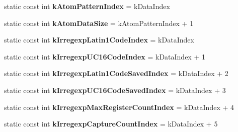 \begin{DoxyCompactItemize}
\item 
static const int {\bfseries k\+Atom\+Pattern\+Index} = k\+Data\+Index\hypertarget{classv8_1_1internal_1_1_j_s_reg_exp_a67adfd18de6fea50f6e492dfdc4b1b04}{}\label{classv8_1_1internal_1_1_j_s_reg_exp_a67adfd18de6fea50f6e492dfdc4b1b04}

\item 
static const int {\bfseries k\+Atom\+Data\+Size} = k\+Atom\+Pattern\+Index + 1\hypertarget{classv8_1_1internal_1_1_j_s_reg_exp_ad68a24d05c9c76742bf98370f73ddde8}{}\label{classv8_1_1internal_1_1_j_s_reg_exp_ad68a24d05c9c76742bf98370f73ddde8}

\item 
static const int {\bfseries k\+Irregexp\+Latin1\+Code\+Index} = k\+Data\+Index\hypertarget{classv8_1_1internal_1_1_j_s_reg_exp_a7d8bb3b9e17479eb8048f9e5d4fc928c}{}\label{classv8_1_1internal_1_1_j_s_reg_exp_a7d8bb3b9e17479eb8048f9e5d4fc928c}

\item 
static const int {\bfseries k\+Irregexp\+U\+C16\+Code\+Index} = k\+Data\+Index + 1\hypertarget{classv8_1_1internal_1_1_j_s_reg_exp_a624664cd30b9dae03165e951d9421831}{}\label{classv8_1_1internal_1_1_j_s_reg_exp_a624664cd30b9dae03165e951d9421831}

\item 
static const int {\bfseries k\+Irregexp\+Latin1\+Code\+Saved\+Index} = k\+Data\+Index + 2\hypertarget{classv8_1_1internal_1_1_j_s_reg_exp_af29f4f258d6cf18df503d7a1203630fb}{}\label{classv8_1_1internal_1_1_j_s_reg_exp_af29f4f258d6cf18df503d7a1203630fb}

\item 
static const int {\bfseries k\+Irregexp\+U\+C16\+Code\+Saved\+Index} = k\+Data\+Index + 3\hypertarget{classv8_1_1internal_1_1_j_s_reg_exp_a09739e5fb05fad16b244502716b4a7a7}{}\label{classv8_1_1internal_1_1_j_s_reg_exp_a09739e5fb05fad16b244502716b4a7a7}

\item 
static const int {\bfseries k\+Irregexp\+Max\+Register\+Count\+Index} = k\+Data\+Index + 4\hypertarget{classv8_1_1internal_1_1_j_s_reg_exp_a6a3fe9d11dfd961544062fff4af53726}{}\label{classv8_1_1internal_1_1_j_s_reg_exp_a6a3fe9d11dfd961544062fff4af53726}

\item 
static const int {\bfseries k\+Irregexp\+Capture\+Count\+Index} = k\+Data\+Index + 5\hypertarget{classv8_1_1internal_1_1_j_s_reg_exp_a0e2173e190617f634aed74000af8f412}{}\label{classv8_1_1internal_1_1_j_s_reg_exp_a0e2173e190617f634aed74000af8f412}


\end{DoxyCompactItemize}
